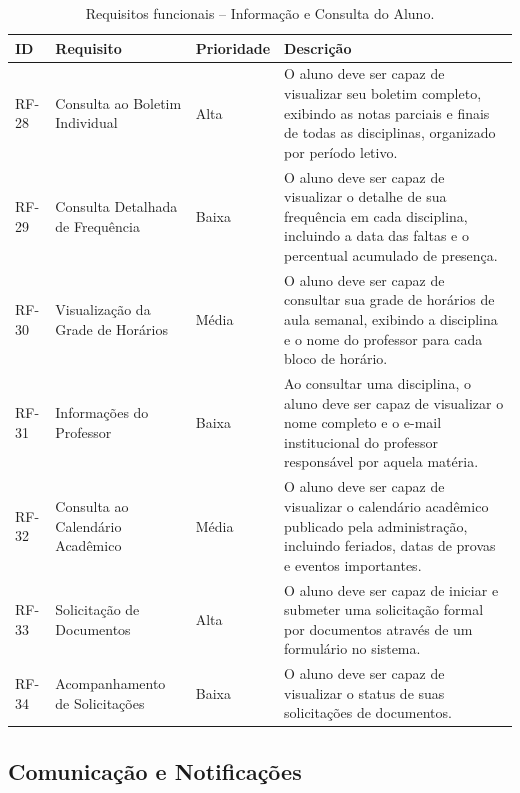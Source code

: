 \begin{table}[H]
\centering
\caption{Requisitos funcionais -- Informação e Consulta do Aluno.}
\begin{tabularx}{\textwidth}{p{} p{} p{} X}
\toprule
\textbf{ID} & \textbf{Requisito} & \textbf{Prioridade} & \textbf{Descrição} \\
\midrule
RF-28 & Consulta ao Boletim Individual & Alta & O aluno deve ser capaz de visualizar seu boletim completo, exibindo as notas parciais e finais de todas as disciplinas, organizado por período letivo. \\
RF-29 & Consulta Detalhada de Frequência & Baixa & O aluno deve ser capaz de visualizar o detalhe de sua frequência em cada disciplina, incluindo a data das faltas e o percentual acumulado de presença. \\
RF-30 & Visualização da Grade de Horários & Média & O aluno deve ser capaz de consultar sua grade de horários de aula semanal, exibindo a disciplina e o nome do professor para cada bloco de horário. \\
RF-31 & Informações do Professor & Baixa & Ao consultar uma disciplina, o aluno deve ser capaz de visualizar o nome completo e o e-mail institucional do professor responsável por aquela matéria. \\
RF-32 & Consulta ao Calendário Acadêmico & Média & O aluno deve ser capaz de visualizar o calendário acadêmico publicado pela administração, incluindo feriados, datas de provas e eventos importantes. \\
RF-33 & Solicitação de Documentos & Alta & O aluno deve ser capaz de iniciar e submeter uma solicitação formal por documentos através de um formulário no sistema. \\
RF-34 & Acompanhamento de Solicitações & Baixa & O aluno deve ser capaz de visualizar o status de suas solicitações de documentos. \\
\bottomrule
\end{tabularx}
\end{table}

\subsection{Comunicação e Notificações}

